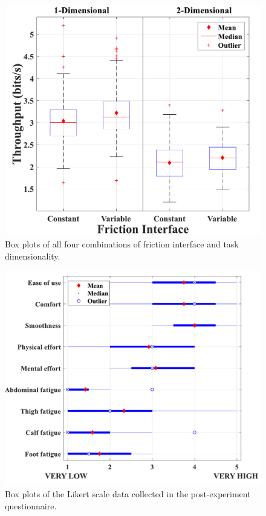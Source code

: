 \documentclass [12pt,letterpaper]{report}
\begin{document}
\begin{figure}[tpb]
  \centering
  \includegraphics[scale=0.45]{fig/CF_VF_boxplot}
  \caption{Box plots of all four combinations of friction interface and task dimensionality.%
  }
  \label{CF_VF_boxplot}
\end{figure}

\newpage %

\begin{figure}[tpb]
  \centering
  \includegraphics[scale=0.55]{fig/likert_boxplot}
  \caption{Box plots of the Likert scale data collected in the post-experiment questionnaire.%
  }
  \label{likert_boxplot}
\end{figure}
\end{document}
